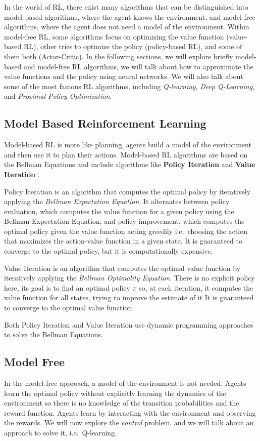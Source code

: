 In the world of RL, there exist many algorithms that can be distinguished into model-based algorithms, where the agent knows the environment, and model-free algorithms, where the agent does not need a model of the environment.
Within model-free RL, some algorithms focus on optimizing the value function (value-based RL), other tries to optimize the policy (policy-based RL), and some of them both (Actor-Critic).
In the following sections, we will explore briefly model-based and model-free RL algorithms, we will talk about how to approximate the value functions and the policy using neural networks.
We will also talk about some of the most famous RL algorithms, including \textit{Q-learning}, \textit{Deep Q-Learning}, and \textit{Proximal Policy Optimization}.


\subsection{Model Based Reinforcement Learning}
\label{subsec:model_based_rl}
Model-based RL is more like planning, agents build a model of the environment and then use it to plan their actions.
Model-based RL algorithms are based on the Bellman Equations and include algorithms like \textbf{Policy Iteration} \citep{howard1960dynamic} and \textbf{Value Iteration} \citep{bellman1966dynamic}.

Policy Iteration is an algorithm that computes the optimal policy by iteratively applying the \textit{Bellman Expectation Equation}.
It alternates between policy evaluation, which computes the value function for a given policy using the Bellman Expectation Equation, and policy improvement, which computes the optimal policy given the value function acting greedily i.e.\ choosing the action that maximizes the action-value function in a given state.
It is guaranteed to converge to the optimal policy, but it is computationally expensive.

Value Iteration is an algorithm that computes the optimal value function by iteratively applying the \textit{Bellman Optimality Equation}.
There is no explicit policy here, its goal is to find an optimal policy $\pi$ so, at each iteration, it computes the value function for all states, trying to improve the estimate of it 
It is guaranteed to converge to the optimal value function.

Both Policy Iteration and Value Iteration use dynamic programming approaches to solve the Bellman Equations.

\subsection{Model Free}
\label{subsec:model_free_rl}
In the model-free approach, a model of the environment is not needed.
Agents learn the optimal policy without explicitly learning the dynamics of the environment so there is no knowledge of the transition probabilities and the reward function.
Agents learn by interacting with the environment and observing the rewards.
We will now explore the \textit{control} problem, and we will talk about an approach to solve it, i.e.\ Q-learning.


